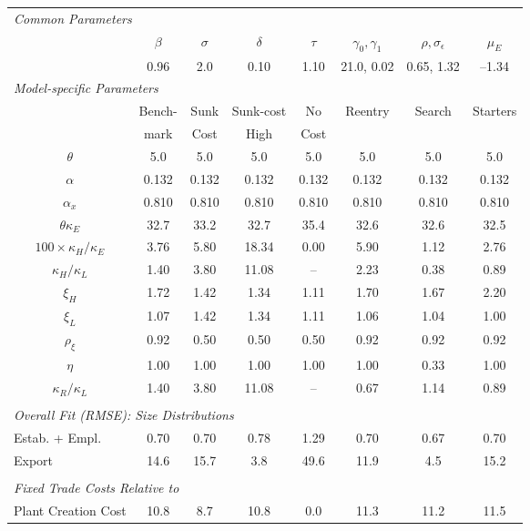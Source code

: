 \documentclass[12pt,leqno]{article}
\begin{document}
\begin{table}[tbp]
\small \centering\begin{tabular}{cccccccc}
\toprule
\multicolumn{8}{l}{\textit{Common Parameters}}\\
& $\beta$ & $\sigma$ & $\delta$ & $\tau$ & $\gamma_0,\gamma_1$ & $\rho,\sigma_\epsilon$ & $\mu_E$ \\
\cmidrule{2-8}
& {0.96} & {2.0} & {0.10} & {1.10} & 21.0, 0.02 & 0.65, 1.32 & --1.34 \\
\multicolumn{8}{l}{\textit{Model-specific Parameters}} \\
& {Bench-} & {Sunk} & {Sunk-cost} & {No} & {Reentry} & {Search} & {Starters}\\[-1mm]
& {mark} & {Cost} & {High} & {Cost} &  &  &  \\
\midrule
$\theta$ & 5.0 & 5.0 & 5.0 & 5.0 & 5.0 & 5.0 & 5.0 \\ 
$\alpha$ & 0.132 & 0.132 & 0.132 & 0.132 & 0.132 & 0.132 & 0.132 \\ 
$\alpha_x$ & 0.810 & 0.810 & 0.810 & 0.810 & 0.810 & 0.810 & 0.810 \\ 
$\theta\kappa_E$ & 32.7 & 33.2 & 32.7 & 35.4 & 32.6 & 32.6 & 32.5 \\ 
$100\times\kappa_H/\kappa_E$ & 3.76 & 5.80 & 18.34 & 0.00 & 5.90 & 1.12 & 2.76 \\ 
$\kappa_H/\kappa_L$ & 1.40 & 3.80 & 11.08 & -- & 2.23 & 0.38 & 0.89 \\ 
$\xi_H$ & 1.72 & 1.42 & 1.34 & 1.11 & 1.70 & 1.67 & 2.20 \\ 
$\xi_L$ & 1.07 & 1.42 & 1.34 & 1.11 & 1.06 & 1.04 & 1.00 \\ 
$\rho_{\xi}$ & 0.92 & 0.50 & 0.50 & 0.50 & 0.92 & 0.92 & 0.92 \\ 
$\eta$ & 1.00 & 1.00 & 1.00 & 1.00 & 1.00 & 0.33 & 1.00 \\ 
$\kappa_R/\kappa_L$ & 1.40 & 3.80 & 11.08 & -- & 0.67 & 1.14 & 0.89 \\ 
&&&&&&&\\
\multicolumn{8}{l}{\textit{Overall Fit (RMSE): Size Distributions}}\\
\multicolumn{1}{l}{Estab. + Empl.} & 0.70 & 0.70 & 0.78 & 1.29 & 0.70 & 0.67 & 0.70 \\ 
\multicolumn{1}{l}{Export} & 14.6 & 15.7 & 3.8 & 49.6 & 11.9 & 4.5 & 15.2 \\ 
&&&&&&&\\
\multicolumn{8}{l}{\textit{Fixed Trade Costs Relative to}}\\
\multicolumn{1}{l}{Plant Creation Cost} & 10.8 & 8.7 & 10.8 & 0.0 & 11.3 & 11.2 & 11.5 \\ 

\end{tabular}
\end{table}
\end{document}
